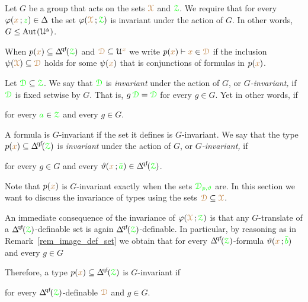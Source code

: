 \begin{assumption}\label{notation_GXphi}
  Let $G$ be a group that acts on the sets ${{\color{brown}\EuScript X}}$ and ${{\color{green}\EuScript Z}}$.
  We require that for every $\varphi({\color{brown} x}\,;{\color{green} z})\in\Delta$ the set $\varphi({\color{brown}\EuScript X}\,;{\color{green}\EuScript Z})$ is invariant under the action of $G$.
  In other words, $G\le{\rm Aut\kern.15ex}(\EuScript U\kern-.2ex^{\scriptscriptstyle\Delta})$.

  When $p({\mr x})\subseteq\qfDelta(\grZ)$ and ${{\color{brown}\EuScript D}}\subseteq\EuScript U^{\color{brown} x}$ we write $p({\color{brown} x})\vdash{\color{brown}x}\in{{\color{brown}\EuScript D}}$ if the inclusion $\psi({\color{brown}\EuScript X})\subseteq{{\color{brown}\EuScript D}}$ holds for some $\psi({\color{brown} x})$ that is conjunctions of formulas in $p({\color{brown} x})$.
\end{assumption}

Let ${\color{green}\EuScript D}\subseteq{\color{green}\EuScript Z}$.
We say that ${\color{green}\EuScript D}$ is \emph{invariant\/} under the action of $G$, or \emph{$G$-invariant,} if  ${\color{green}\EuScript D}$ is fixed setwise by $G$.
That is, $g\,{\color{green}\EuScript D}={\color{green}\EuScript D}$ for every $g\in G$.
Yet in other words, if

\hfill for every ${\color{green} a}\in{\color{green}\EuScript Z}$ and every $g\in G$.

A formula is $G$-invariant if the set it defines is $G$-invariant.
We say that the type $p({\mr x})\subseteq\qfDelta(\grZ)$ is \emph{invariant\/} under the action of $G$, or \emph{$G$-invariant,} if 

\hfill for every $g\in G$ and every $\theta({\mr x}\,;{\gr\bar a})\in\qfDelta(\grZ)$.

Note that $p({\color{brown} x})$ is $G$-invariant exactly when the sets ${\color{green}\EuScript D_{p,\vartheta}}$ are.
In this section we want to discuss the invariance of types using the sets ${\color{brown}\EuScript D}\subseteq{\color{brown}\EuScript X}$.

An immediate consequence of the invariance of $\varphi({\color{brown}\EuScript X}\,;{\color{green}\EuScript Z})$ is that any $G$-translate of a $\qfDelta({\grZ})$-definable set is again $\qfDelta({\grZ})$-definable.
In particular, by reasoning as in Remark~\ref{rem_image_def_set} we obtain that for every $\qfDelta({\grZ})$-formula $\vartheta({\color{brown} x}\,;{\color{green}\bar b})$ and every $g\in G$


Therefore, a type $p({\mr x})\subseteq\qfDelta(\grZ)$ is $G$-invariant if

\hfill for every $\qfDelta({\grZ})$-definable ${\color{brown}\EuScript D}$ and $g\in G$.

